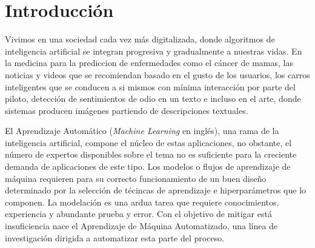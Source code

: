 \chapter*{Introducción}\label{chapter:introduction}
Vivimos en una sociedad cada vez m\'as digitalizada, donde algoritmos de inteligencia artificial se integran progresiva y gradualmente a nuestras vidas. En la medicina para la prediccion de enfermedades como el c\'ancer de mamas, las noticias y videos que se recomiendan basado en el gusto de los usuarios, los carros inteligentes que se conducen a si mismos con m\'inima interacci\'on por parte del piloto, detecci\'on de sentimientos de odio en un texto e incluso en el arte, donde sistemas producen im\'agenes partiendo de descripciones textuales.

El Aprendizaje Autom\'atico (\textit{Machine Learning} en ingl\'es), una rama de la inteligencia artificial, compone el n\'ucleo de estas aplicaciones, no obstante, el n\'umero de expertos disponibles sobre el tema no es suficiente para la creciente demanda de aplicaciones de este tipo. Los modelos o flujos de aprendizaje de m\'aquina requieren para su correcto funcionamiento de un buen dise\~no determinado por la selecci\'on de t\'ecincas de aprendizaje e hiperpar\'ametros que lo componen. La modelaci\'on  es una ardua tarea que requiere conocimientos, experiencia y abundante prueba y error. Con el objetivo de mitigar est\'a insuficiencia nace el Aprendizaje de M\'aquina Automatizado, una l\'inea de investigaci\'on dirigida a automatizar esta parte del proceso.

